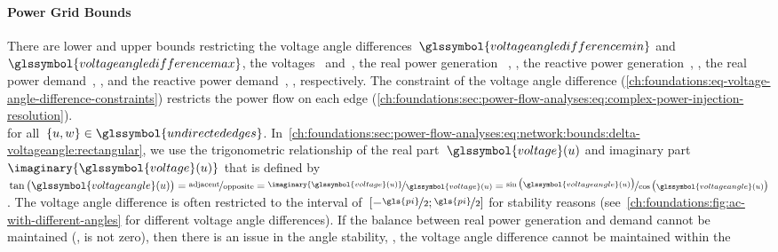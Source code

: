 \paragraph{Power Grid Bounds}%
\label{ch:foundations:power-grid-bounds}
% 
There are lower and upper bounds restricting the voltage angle
differences~$\glssymbol{voltageangledifferencemin}$
and~$\glssymbol{voltageangledifferencemax}$, the
voltages~
and~, the real power generation~
,
, the reactive power
generation~,
,
the real power demand~,
, and the reactive power
demand~,
, respectively. The constraint of the voltage
angle difference (\cref{ch:foundations:eq-voltage-angle-difference-constraints})
restricts the power flow on each edge
(\cref{ch:foundations:sec:power-flow-analyses:eq:complex-power-injection-resolution}).
% 
\begin{subequations}
    
    \label{ch:foundations:eq-voltage-angle-difference-constraints}
\end{subequations}%
% 
for all~$\{\vertexa,\vertexc\}\in\glssymbol{undirectededges}$.
In~\cref{ch:foundations:sec:power-flow-analyses:eq:network:bounds:delta-voltageangle:rectangular},
we use the trigonometric relationship of the real part~$\real{
\glssymbol{voltage}(\vertexa)}$ and imaginary
part~$\imaginary{\glssymbol{voltage}(\vertexa)}$ that is defined by~$
\tan\big(\glssymbol{voltageangle}(\vertexa)\big) 
=
\nicefrac{
    \text{adjacent}
  }{
    \text{opposite}
  } 
= 
\nicefrac{
    \imaginary{\glssymbol{voltage}(\vertexa)}
  }{
    \real{\glssymbol{voltage}(\vertexa)}
  } 
= 
\nicefrac{
    \sin\big(\glssymbol{voltageangle}(\vertexa)\big)
  }{
    \cos\big(\glssymbol{voltageangle}(\vertexa)\big)
  }
$.
% 
The voltage angle difference is often restricted to the interval
of~$[-\nicefrac{\gls{pi}}{2};
\nicefrac{\gls{pi}}{2}]$ for stability reasons
(see~\cref{ch:foundations:fig:ac-with-different-angles} for different voltage
angle differences). If the balance between real power generation and demand
cannot be maintained (\ie, is not zero), then there is an issue in the angle
stability, \ie, the voltage angle difference cannot be maintained within the
